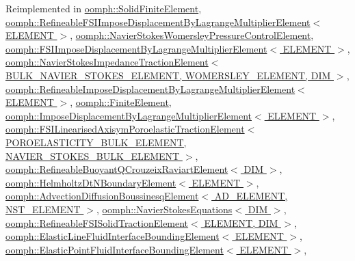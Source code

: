 Reimplemented in \hyperlink{classoomph_1_1SolidFiniteElement_a3167a2005e33815948bef357214e15ee}{oomph\+::\+Solid\+Finite\+Element}, \hyperlink{classoomph_1_1RefineableFSIImposeDisplacementByLagrangeMultiplierElement_a3c86bf6884cd7cfdfa8e7381fbd16fcf}{oomph\+::\+Refineable\+F\+S\+I\+Impose\+Displacement\+By\+Lagrange\+Multiplier\+Element$<$ E\+L\+E\+M\+E\+N\+T $>$}, \hyperlink{classoomph_1_1NavierStokesWomersleyPressureControlElement_aa899b746f1831673358ba6a71409e45c}{oomph\+::\+Navier\+Stokes\+Womersley\+Pressure\+Control\+Element}, \hyperlink{classoomph_1_1FSIImposeDisplacementByLagrangeMultiplierElement_a48006d22e0ad79703914c687390150b8}{oomph\+::\+F\+S\+I\+Impose\+Displacement\+By\+Lagrange\+Multiplier\+Element$<$ E\+L\+E\+M\+E\+N\+T $>$}, \hyperlink{classoomph_1_1NavierStokesImpedanceTractionElement_a708121c1a4224d0d2c572904f74f2fb6}{oomph\+::\+Navier\+Stokes\+Impedance\+Traction\+Element$<$ B\+U\+L\+K\+\_\+\+N\+A\+V\+I\+E\+R\+\_\+\+S\+T\+O\+K\+E\+S\+\_\+\+E\+L\+E\+M\+E\+N\+T, W\+O\+M\+E\+R\+S\+L\+E\+Y\+\_\+\+E\+L\+E\+M\+E\+N\+T, D\+I\+M $>$}, \hyperlink{classoomph_1_1RefineableImposeDisplacementByLagrangeMultiplierElement_af0d1b2633de720222d85e2083296a209}{oomph\+::\+Refineable\+Impose\+Displacement\+By\+Lagrange\+Multiplier\+Element$<$ E\+L\+E\+M\+E\+N\+T $>$}, \hyperlink{classoomph_1_1FiniteElement_a0ae7af222af38a0d53bf283dc85bdfea}{oomph\+::\+Finite\+Element}, \hyperlink{classoomph_1_1ImposeDisplacementByLagrangeMultiplierElement_a8f196eaf084264031cf36fb541978123}{oomph\+::\+Impose\+Displacement\+By\+Lagrange\+Multiplier\+Element$<$ E\+L\+E\+M\+E\+N\+T $>$}, \hyperlink{classoomph_1_1FSILinearisedAxisymPoroelasticTractionElement_a98dbef42bb96b9d1f53184161e860a98}{oomph\+::\+F\+S\+I\+Linearised\+Axisym\+Poroelastic\+Traction\+Element$<$ P\+O\+R\+O\+E\+L\+A\+S\+T\+I\+C\+I\+T\+Y\+\_\+\+B\+U\+L\+K\+\_\+\+E\+L\+E\+M\+E\+N\+T, N\+A\+V\+I\+E\+R\+\_\+\+S\+T\+O\+K\+E\+S\+\_\+\+B\+U\+L\+K\+\_\+\+E\+L\+E\+M\+E\+N\+T $>$}, \hyperlink{classoomph_1_1RefineableBuoyantQCrouzeixRaviartElement_a0d05a727999c7f102f3fe2bacce38f6b}{oomph\+::\+Refineable\+Buoyant\+Q\+Crouzeix\+Raviart\+Element$<$ D\+I\+M $>$}, \hyperlink{classoomph_1_1HelmholtzDtNBoundaryElement_afb3ab9366490295ba422a9c3fa7d6279}{oomph\+::\+Helmholtz\+Dt\+N\+Boundary\+Element$<$ E\+L\+E\+M\+E\+N\+T $>$}, \hyperlink{classoomph_1_1AdvectionDiffusionBoussinesqElement_afc63db5ad4e397df7809447ee3ca56ac}{oomph\+::\+Advection\+Diffusion\+Boussinesq\+Element$<$ A\+D\+\_\+\+E\+L\+E\+M\+E\+N\+T, N\+S\+T\+\_\+\+E\+L\+E\+M\+E\+N\+T $>$}, \hyperlink{classoomph_1_1NavierStokesEquations_aba9a7da719632a9003d2358e64713241}{oomph\+::\+Navier\+Stokes\+Equations$<$ D\+I\+M $>$}, \hyperlink{classoomph_1_1RefineableFSISolidTractionElement_a886a6bcb5722c9535f6f78ccefdc0646}{oomph\+::\+Refineable\+F\+S\+I\+Solid\+Traction\+Element$<$ E\+L\+E\+M\+E\+N\+T, D\+I\+M $>$}, \hyperlink{classoomph_1_1ElasticLineFluidInterfaceBoundingElement_a71b23e3ad49d5137ca4a7f654f828077}{oomph\+::\+Elastic\+Line\+Fluid\+Interface\+Bounding\+Element$<$ E\+L\+E\+M\+E\+N\+T $>$}, \hyperlink{classoomph_1_1ElasticPointFluidInterfaceBoundingElement_a87802dab899430374a926d1e1bf3d90b}{oomph\+::\+Elastic\+Point\+Fluid\+Interface\+Bounding\+Element$<$ E\+L\+E\+M\+E\+N\+T $>$}, 